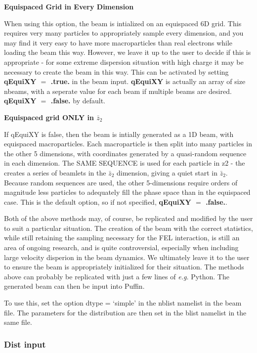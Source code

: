 \documentclass[12pt]{article}%
\begin{document}
{\bf Equispaced Grid in Every Dimension}

When using this option, the beam is intialized on an equispaced 6D grid. This requires very many particles to appropriately sample every dimension, and you may find it very easy to have more macroparticles than real electrons while loading the beam this way. However, we leave it up to the user to decide if this is appropriate - for some extreme dispersion situation with high charge it may be necessary to create the beam in this way.  This can be activated by setting {\bf qEquiXY $=$ .true.} in the beam input. {\bf qEquiXY} is actually an array of size nbeams, with a seperate value for each beam if multiple beams are desired. {\bf qEquiXY $=$ .false.} by default.

{\bf Equispaced grid ONLY in $\bar{z}_2$}

If qEquiXY is false, then the beam is intially generated as a 1D beam, with equispaced macroparticles. Each macroparticle is then split into many particles in the other 5 dimensions, with coordinates generated by a quasi-random sequence in each dimension. The SAME SEQUENCE is used for each particle in z2 - the creates a series of beamlets in the $\bar{z}_2$ dimension, giving a quiet start in $\bar{z}_2$. Because random sequences are used, the other 5-dimensions require orders of magnitude less particles to adequately fill the phase space than in the equispaced case. This is the default option, so if not specified, {\bf qEquiXY $=$ .false.}.

Both of the above methods may, of course, be replicated and modified by the user to suit a particular situation. The creation of the beam with the correct statistics, while still retaining the sampling necessary for the FEL interaction, is still an area of ongoing research, and is quite controversial, especially when including large velocity disperion in the beam dynamics. We ultimately leave it to the user to ensure the beam is appropriately initialized for their situation. The methods above can probably be replicated with just a few lines of \textit{e.g.} Python. The generated beam can then be input into Puffin.

To use this, set the option dtype = `simple' in the nblist namelist in the beam file. The parameters for the distribution are then set in the blist namelist in the same file.

\subsubsection{Dist input}
\end{document}
